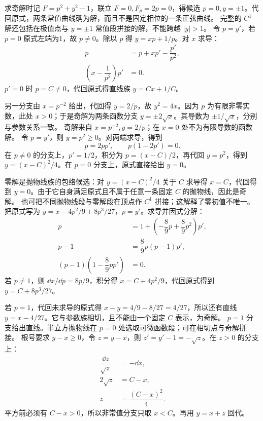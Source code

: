 求奇解时记 $F=p^2+y^2-1$，联立 $F=0,F_p=2p=0$，得候选 $p=0,y=\pm1$。代回原式，两条常值曲线确为解，而且不是固定相位的一条正弦曲线。
完整的 $C^1$ 解还包括在极值点与 $y=\pm1$ 常值段拼接的解，不能跨越 $|y|>1$。
令 $p=y'$，若 $p=0$ 原式左端为1，故 $p\ne0$。除以 $p$ 得 $y=xp+1/p$。对 $x$ 求导：
\[
\begin{aligned}
p&=p+xp'-\dfrac{p'}{p^2},\\
\left(x-\dfrac1{p^2}\right)p'&=0.
\end{aligned}
\]
$p'=0$ 时 $p=C\ne0$，代回原式得直线族 $y=Cx+1/C$。

另一分支由 $x=p^{-2}$ 给出，代回得 $y=2/p$，故 $y^2=4x$。因为 $p$ 为有限非零实数，此处 $x>0$；于是奇解为两条函数分支 $y=\pm2\sqrt x$。其导数为 $\pm1/\sqrt x$，分别与参数关系一致。
奇解来自 $x=p^{-2},y=2/p$；在 $x=0$ 处不为有限导数的函数解。
令 $p=y'$，则 $y=p^2\ge0$。对两端求导，得到
\[
p=2pp',\qquad p(1-2p')=0.
\]
在 $p\ne0$ 的分支上，$p'=1/2$，积分为 $p=(x-C)/2$，再代回 $y=p^2$，得到 $y=(x-C)^2/4$。在 $p=0$ 分支上，原式直接给出 $y=0$。

零解是抛物线族的包络候选：对 $y=(x-C)^2/4$ 关于 $C$ 求导得 $x=C$，代回得到 $y=0$。由于它自身满足原式且不属于任意一条固定 $C$ 的抛物线，因此是奇解。
也可把不同抛物线段与零解段在顶点作 $C^1$ 拼接；这解释了零初值不唯一。
把原式写为 $y=x-4p^2/9+8p^3/27$，$p=y'$。求导并因式分解：
\[
\begin{aligned}
p&=1+\left(-\dfrac89p+\dfrac89p^2\right)p',\\
p-1&=\dfrac89p(p-1)p',\\
(p-1)\left(1-\dfrac89pp'\right)&=0.
\end{aligned}
\]
若 $p\ne1$，则 $\dd x/\dd p=8p/9$，积分得 $x=C+4p^2/9$，代回原式得到 $y=C+8p^3/27$。

若 $p=1$，代回未求导的原式得 $x-y=4/9-8/27=4/27$，所以还有直线 $y=x-4/27$。它与参数族相切，且不能由一个固定 $C$ 表示，为奇解。
$p=1$ 分支给出直线。半立方抛物线在 $p=0$ 处选取可微函数段；可在相切点与奇解拼接。
根号要求 $y-x\ge0$，令 $z=y-x$，则 $z'=y'-1=-\sqrt z$。在 $z>0$ 的分支上：
\[
\begin{aligned}
\dfrac{\dd z}{\sqrt z}&=-\dd x,\\
2\sqrt z&=C-x,\\
z&=\dfrac{(C-x)^2}{4}.
\end{aligned}
\]
平方前必须有 $C-x>0$，所以非常值分支只取 $x<C$。再用 $y=x+z$ 回代。


